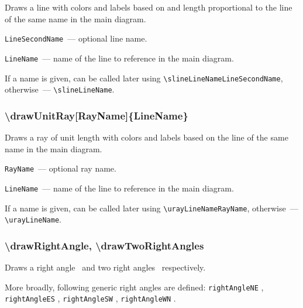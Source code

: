 	Draws a line with colors and labels based on and length proportional to the line of the same name in the main diagram.

	\texttt{LineSecondName}~— optional line name. 
	
	\texttt{LineName}~— name of the line to reference in the main diagram. 
	
	If a name is given, can be called later using \texttt{\textbackslash slineLineNameLineSecondName}, otherwise~— \texttt{\textbackslash slineLineName}. 

\subsubsection{\textbackslash drawUnitRay[RayName]\{LineName\}}

	Draws a ray of unit length with colors and labels based on the line of the same name in the main diagram.

	\texttt{RayName}~— optional ray name.
	
	\texttt{LineName}~— name of the line to reference in the main diagram. 

	If a name is given, can be called later using \texttt{\textbackslash urayLineNameRayName}, otherwise~— \texttt{\textbackslash urayLineName}. 



	




\subsubsection{\textbackslash drawRightAngle, \textbackslash drawTwoRightAngles}
	Draws a right angle \drawRightAngle\ and two right angles \drawTwoRightAngles\ respectively. 
	
	More broadly, following generic right angles are defined: \texttt{rightAngleNE} ,  \texttt{rightAngleES} ,  \texttt{rightAngleSW} ,  \texttt{rightAngleWN} . 
	
